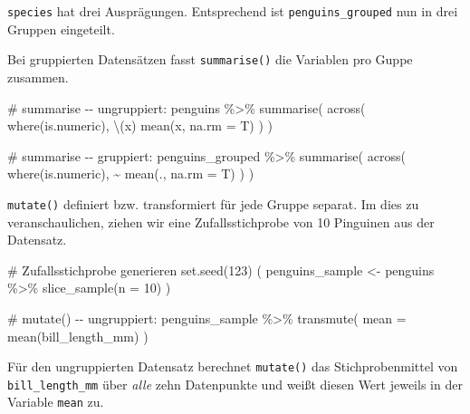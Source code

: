 \documentclass[
  a4paper,
  DIV=11,
  oneside]{scrreprt}
\newenvironment{Shaded}{\begin{snugshade}}{\end{snugshade}}
\newcommand{\NormalTok}[1]{\textcolor[rgb]{0.00,0.23,0.31}{#1}}
\begin{document}
\texttt{species} hat drei Ausprägungen. Entsprechend ist
\texttt{penguins\_grouped} nun in drei Gruppen eingeteilt.

Bei gruppierten Datensätzen fasst \texttt{summarise()} die Variablen pro
Guppe zusammen.

\begin{Shaded}
\begin{Highlighting}[]
\NormalTok{\# summarise {-}{-} ungruppiert:}
\NormalTok{penguins \%\textgreater{}\%}
\NormalTok{  summarise(}
\NormalTok{    across(}
\NormalTok{      where(is.numeric), \textbackslash{}(x) mean(x, na.rm = T)}
\NormalTok{      )}
\NormalTok{    )}
\end{Highlighting}
\end{Shaded}

\begin{Shaded}
\begin{Highlighting}[]
\NormalTok{\# summarise {-}{-} gruppiert:    }
\NormalTok{penguins\_grouped \%\textgreater{}\%}
\NormalTok{  summarise(}
\NormalTok{    across(}
\NormalTok{      where(is.numeric), }
\NormalTok{      \textasciitilde{} mean(., na.rm = T)}
\NormalTok{    )}
\NormalTok{  )}
\end{Highlighting}
\end{Shaded}

\texttt{mutate()} definiert bzw. transformiert für jede Gruppe separat.
Im dies zu veranschaulichen, ziehen wir eine Zufallsstichprobe von 10
Pinguinen aus der Datensatz.

\begin{Shaded}
\begin{Highlighting}[]
\NormalTok{\# Zufallsstichprobe generieren}
\NormalTok{set.seed(123)}
\NormalTok{(}
\NormalTok{  penguins\_sample \textless{}{-} penguins \%\textgreater{}\%}
\NormalTok{    slice\_sample(n = 10)  }
\NormalTok{)}
\end{Highlighting}
\end{Shaded}

\begin{Shaded}
\begin{Highlighting}[]
\NormalTok{\# mutate() {-}{-} ungruppiert:}
\NormalTok{penguins\_sample \%\textgreater{}\%}
\NormalTok{  transmute(}
\NormalTok{    mean = mean(bill\_length\_mm)}
\NormalTok{  )}
\end{Highlighting}
\end{Shaded}

Für den ungruppierten Datensatz berechnet \texttt{mutate()} das
Stichprobenmittel von \texttt{bill\_length\_mm} über \emph{alle} zehn
Datenpunkte und weißt diesen Wert jeweils in der Variable \texttt{mean}
zu.
\end{document}
